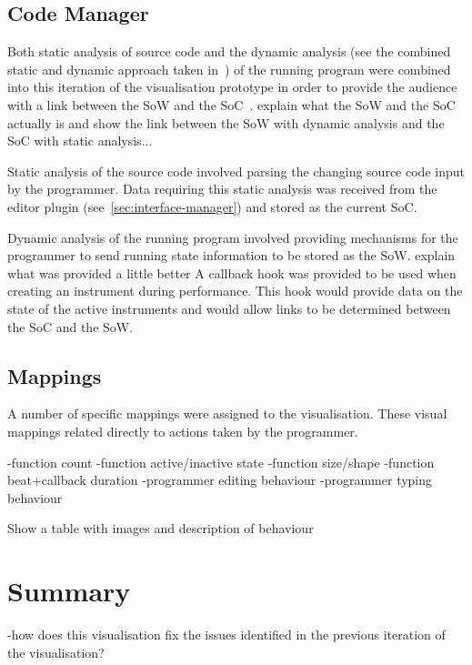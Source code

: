\subsection{Code Manager}

Both static analysis of source code and the dynamic analysis (see the combined static and dynamic approach taken in~\cite{Eisenbarth2003}) of the running program were combined into this iteration of the visualisation prototype in order to provide the audience with a link between the \ac{SoW} and the \ac{SoC}~\cite{Swift2013}. {\color{red} explain what the \ac{SoW} and the \ac{SoC} actually is and show the link between the \ac{SoW} with dynamic analysis and the \ac{SoC} with static analysis...}

Static analysis of the source code involved parsing the changing source code input by the programmer. Data requiring this static analysis was received from the editor plugin (see~\ref{sec:interface-manager}) and stored as the current \ac{SoC}.

Dynamic analysis of the running program involved providing mechanisms for the programmer to send running state information to be stored as the \ac{SoW}. {\color{red} explain what was provided a little better} A callback hook was provided to be used when creating an instrument during performance. This hook would provide data on the state of the active instruments and would allow links to be determined between the \ac{SoC} and the \ac{SoW}.

\subsection{Mappings}

A number of specific mappings were assigned to the visualisation. These visual mappings related directly to actions taken by the programmer. 

-function count
-function active/inactive state
-function size/shape
-function beat+callback duration
-programmer editing behaviour
-programmer typing behaviour

{\color{red} Show a table with images and description of behaviour}

\section{Summary}

-how does this visualisation fix the issues identified in the previous iteration of the visualisation?



